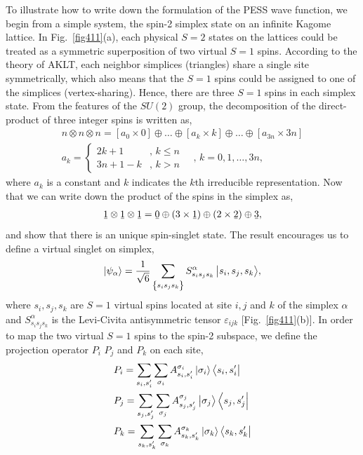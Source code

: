 To illustrate how to write down the formulation of the PESS wave function, we begin from a simple system, the spin-2 simplex state on an infinite Kagome lattice. In Fig.~\ref{fig411}(a), each physical $S=2$ states on the lattices could be treated as a symmetric superposition of two virtual $S=1$ spins. According to the theory of AKLT, each neighbor simplices (triangles) share a single site symmetrically, which also means that the $S=1$ spins could be assigned to one of the simplices (vertex-sharing). Hence, there are three $S=1$ spins in each simplex state. From the features of the $SU(2)$ group, the decomposition of the direct-product of three integer spins is written as, 
\begin{align}
	\label{su2}
	n \otimes n \otimes n = [a_0 \times 0] \oplus \dots \oplus [a_k \times k] \oplus \dots \oplus [a_{3n} \times 3n] \\
	a_k = \begin{cases}
		2k + 1 & \text{, $k \leq n$} \\
		3n + 1 - k & \text{, $k > n$} 
	\end{cases}
	\quad \text{, } k = 0, 1, \dots , 3n ,
\end{align}
where $a_k$ is a constant and $k$ indicates the $k$th irreducible representation. Now that we can write down the product of the spins in the simplex as,  
\begin{align}
	\label{111}
	\barbelow{1} \otimes \barbelow{1} \otimes \barbelow{1} = \barbelow{0} \oplus \left( 3 \times \barbelow{1} \right) \oplus \left( 2 \times \barbelow{2} \right) \oplus \barbelow{3},
\end{align}
and show that there is an unique spin-singlet state. The result encourages us to define a virtual singlet on simplex,
\begin{align}
	\Ket{\psi_{\alpha}} = \frac{1}{\sqrt{6}} \sum_{\left\{ s_i s_j s_k\right\}}{S^{\alpha}_{s_i s_j s_k}\Ket{s_i, s_j, s_k}},
\end{align}
where $s_i,s_j,s_k$ are $S=1$ virtual spins located at site $i,j$ and $k$ of the simplex $\alpha$ and $S^{\alpha}_{s_i s_j s_k}$ is the Levi-Civita antisymmetric tensor $\varepsilon_{ijk}$ [Fig.~\ref{fig411}(b)]. In order to  map the two virtual $S=1$ spins to the spin-2 subspace, we define the projection operator $P_i$ $P_j$ and $P_k$ on each site,
\begin{align}
	&P_i = \sum_{s_i,s^{\prime}_{i}}\sum_{\sigma_i}{A^{\sigma_i}_{s_i,s_i^{\prime}}\Ket{\sigma_i}\Bra{s_i,s_i^{\prime}}} \\
	&P_j = \sum_{s_j,s^{\prime}_{j}}\sum_{\sigma_j}{A^{\sigma_j}_{s_j,s_j^{\prime}}\Ket{\sigma_j}\Bra{s_j,s_j^{\prime}}} \\
	&P_k = \sum_{s_k,s^{\prime}_{k}}\sum_{\sigma_k}{A^{\sigma_k}_{s_k,s_k^{\prime}}\Ket{\sigma_k}\Bra{s_k,s_k^{\prime}}}
\end{align}
